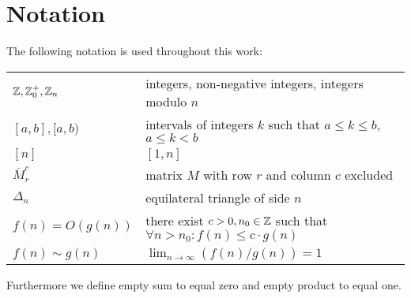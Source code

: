 \chapter*{Notation}

The following notation is used throughout this work:
\bigskip

\noindent
\begin{tabularx}{\linewidth}{l X}
	$\mathbb Z, \mathbb Z_0^+, \mathbb Z_n$ & integers, non-negative integers, integers modulo $n$ \\
	$[a,b], [a,b)$ & intervals of integers $k$ such that $a \leq k \leq b$, $a \leq k < b$ \\
	$[n]$ & $[1,n]$ \\
	$\overbar{M}_r^c$ & matrix $M$ with row $r$ and column $c$ excluded \\
	$\Delta_n$ & equilateral triangle of side $n$ \\
	$f(n) = O(g(n))$ & there exist $c > 0, n_0 \in \mathbb Z$ such that $\forall n > n_0: f(n) \leq c\cdot g(n)$ \\
	$f(n) \sim g(n)$ & $\lim_{n \rightarrow \infty} (f(n)/g(n)) = 1$ \\
\end{tabularx}
\bigskip 

\noindent
Furthermore we define empty sum to equal zero and empty product to equal one.
